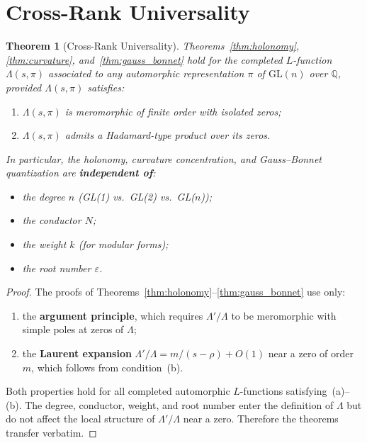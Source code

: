 \documentclass[11pt, a4paper]{article}
\theoremstyle{definition}
\theoremstyle{plain}
\newtheorem{theorem}{Theorem}[section]
\begin{document}
\section{Cross-Rank Universality}
\label{sec:universality_thm}

\begin{theorem}[Cross-Rank Universality]
\label{thm:universality}
Theorems~\ref{thm:holonomy}, \ref{thm:curvature},
and~\ref{thm:gauss_bonnet} hold for the completed $L$-function
$\Lambda(s, \pi)$ associated to \emph{any} automorphic representation
$\pi$ of $\mathrm{GL}(n)$ over $\mathbb{Q}$, provided $\Lambda(s,\pi)$
satisfies:
\begin{enumerate}
  \item[\textup{(a)}] $\Lambda(s,\pi)$ is meromorphic of finite order
    with isolated zeros;
  \item[\textup{(b)}] $\Lambda(s,\pi)$ admits a Hadamard-type product
    over its zeros.
\end{enumerate}
In particular, the holonomy, curvature concentration, and Gauss--Bonnet
quantization are \textbf{independent of}:
\begin{itemize}
  \item the degree $n$ (GL(1) vs.\ GL(2) vs.\ GL($n$));
  \item the conductor $N$;
  \item the weight $k$ (for modular forms);
  \item the root number $\varepsilon$.
\end{itemize}
\end{theorem}

\begin{proof}
The proofs of Theorems~\ref{thm:holonomy}--\ref{thm:gauss_bonnet}
use only:
\begin{enumerate}
  \item the \textbf{argument principle}, which requires $\Lambda'/\Lambda$
    to be meromorphic with simple poles at zeros of $\Lambda$;
  \item the \textbf{Laurent expansion}
    $\Lambda'/\Lambda = m/(s-\rho) + O(1)$ near a zero of order $m$,
    which follows from condition~(b).
\end{enumerate}
Both properties hold for all completed automorphic $L$-functions
satisfying~(a)--(b). The degree, conductor, weight, and root number
enter the definition of $\Lambda$ but do not affect the local structure
of $\Lambda'/\Lambda$ near a zero. Therefore the theorems transfer
verbatim.
\end{proof}
\end{document}
